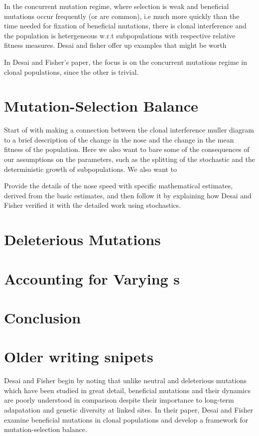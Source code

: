 \documentclass[12pt,twocolumn]{article}
\begin{document}
In the concurrent mutation regime, where selection is weak and beneficial mutations occur frequently (or are common), i.e much more quickly than the time needed for fixation of beneficial mutations, there is clonal interference and the population is hetergeneous w.r.t subpopulations with respective relative fitness measures. Desai and fisher offer up examples that might be worth  

In Desai and Fisher's paper, the focus is on the concurrent mutations regime in clonal populations, since the other is trivial.

\section{Mutation-Selection Balance}
Start of with making a connection between the clonal interference muller diagram to a brief description of the change in the nose and the change in the mean fitness of the population.  Here we also want to bare some of the consequences of our assumptions on the parameters, such as the splitting of the stochastic and the deterministic growth of subpopulations.  We also want to 

Provide the details of the nose speed with specific mathematical estimates, derived from the basic estimates, and then follow it by explaining how Desai and Fisher verified it with the detailed work using stochastics.


\section{Deleterious Mutations}

\section{Accounting for Varying s}

\section{Conclusion}

\section*{Older writing snipets}
Desai and Fisher \cite{DesFish07} begin by noting that unlike neutral and deleterious mutations which have been studied in great detail, beneficial mutations and their dynamics are poorly understood in comparison despite their importance to long-term adapatation and genetic diversity at linked sites.  In their paper, Desai and Fisher examine beneficial mutations in clonal populations and develop a framework for mutation-selection balance.  
\end{document}
